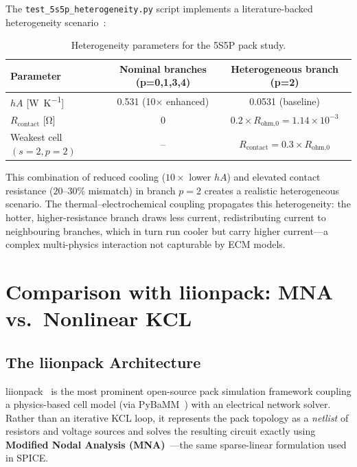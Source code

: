 The \texttt{test\_5s5p\_heterogeneity.py} script implements a literature-backed heterogeneity scenario~\cite{Gogoana2014}:

\begin{table}[H]
\centering
\caption{Heterogeneity parameters for the 5S5P pack study.}
\label{tab:hetero_params}
\begin{tabular}{lcc}
\toprule
\textbf{Parameter} & \textbf{Nominal branches (p=0,1,3,4)} & \textbf{Heterogeneous branch (p=2)} \\
\midrule
$hA$ [\si{\watt\per\kelvin}] & 0.531 (10$\times$ enhanced) & 0.0531 (baseline) \\
$R_\text{contact}$ [\si{\ohm}] & 0 & $0.2\times R_\text{ohm,0} = 1.14\times10^{-3}$ \\
Weakest cell $(s=2,p=2)$ & -- & $R_\text{contact} = 0.3 \times R_\text{ohm,0}$ \\
\bottomrule
\end{tabular}
\end{table}

This combination of reduced cooling ($10\times$ lower $hA$) and elevated contact resistance ($20$--$30\%$ mismatch) in branch $p=2$ creates a realistic heterogeneous scenario. The thermal--electrochemical coupling propagates this heterogeneity: the hotter, higher-resistance branch draws less current, redistributing current to neighbouring branches, which in turn run cooler but carry higher current---a complex multi-physics interaction not capturable by ECM models.

\section{Comparison with liionpack: MNA vs.\ Nonlinear KCL}
\label{sec:liionpack_comparison}

\subsection{The liionpack Architecture}
\label{ssec:liionpack_arch}

liionpack~\cite{Tranter2022} is the most prominent open-source pack simulation framework coupling a physics-based cell model (via PyBaMM~\cite{Sulzer2021}) with an electrical network solver. Rather than an iterative KCL loop, it represents the pack topology as a \emph{netlist} of resistors and voltage sources and solves the resulting circuit exactly using \textbf{Modified Nodal Analysis (MNA)}~\cite{Ho1975}---the same sparse-linear formulation used in SPICE.

